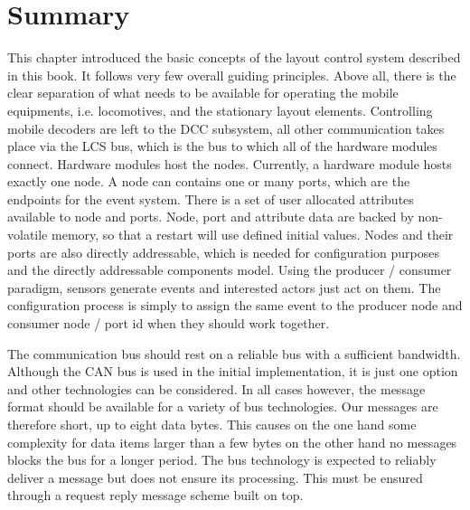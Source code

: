 \section{Summary}

This chapter introduced the basic concepts of the layout control system described in this book. It follows very few overall guiding principles. Above all, there is the clear separation of what needs to be available for operating the mobile equipments, i.e. locomotives, and the stationary layout elements. Controlling mobile decoders are left to the DCC subsystem, all other communication takes place via the LCS bus, which is the bus to which all of the hardware modules connect. Hardware modules host the nodes. Currently, a hardware module hosts exactly one node. A node can contains one or many ports, which are the endpoints for the event system. There is a set of user allocated attributes available to node and ports. Node, port and attribute data are backed by non-volatile memory, so that a restart will use defined initial values. Nodes and their ports are also directly addressable, which is needed for configuration purposes and the directly addressable components model. Using the producer / consumer paradigm, sensors generate events and interested actors just act on them. The configuration process is simply to assign the same event to the producer node and consumer node / port id when they should work together.

The communication bus should rest on a reliable bus with a sufficient bandwidth. Although the CAN bus is used in the initial implementation, it is just one option and other technologies can be considered. In all cases however, the message format should be available for a variety of bus technologies. Our messages are therefore short, up to eight data bytes. This causes on the one hand some complexity for data items larger than a few bytes on the other hand no messages blocks the bus for a longer period. The bus technology is expected to reliably deliver a message but does not ensure its processing. This must be ensured through a request reply message scheme built on top.

